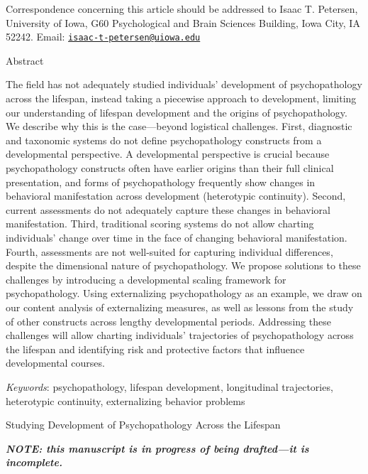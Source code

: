 \documentclass[
  american,
  letterpaper,
  12pt]{article}
\newcommand{\apatitle}[1]{%
  {\centering\bfseries #1\par}}
\newcommand{\apatitlepageheading}[1]{%
  {\centering\bfseries #1\par}}
\begin{document}
Correspondence concerning this article should be addressed to Isaac T.
Petersen, University of Iowa, G60 Psychological and Brain Sciences
Building, Iowa City, IA 52242. Email:
\href{mailto:isaac-t-petersen@uiowa.edu}{\nolinkurl{isaac-t-petersen@uiowa.edu}}

\clearpage

\apatitlepageheading{

Abstract

}

The field has not adequately studied individuals' development of
psychopathology across the lifespan, instead taking a piecewise approach
to development, limiting our understanding of lifespan development and
the origins of psychopathology. We describe why this is the
case---beyond logistical challenges. First, diagnostic and taxonomic
systems do not define psychopathology constructs from a developmental
perspective. A developmental perspective is crucial because
psychopathology constructs often have earlier origins than their full
clinical presentation, and forms of psychopathology frequently show
changes in behavioral manifestation across development (heterotypic
continuity). Second, current assessments do not adequately capture these
changes in behavioral manifestation. Third, traditional scoring systems
do not allow charting individuals' change over time in the face of
changing behavioral manifestation. Fourth, assessments are not
well-suited for capturing individual differences, despite the
dimensional nature of psychopathology. We propose solutions to these
challenges by introducing a developmental scaling framework for
psychopathology. Using externalizing psychopathology as an example, we
draw on our content analysis of externalizing measures, as well as
lessons from the study of other constructs across lengthy developmental
periods. Addressing these challenges will allow charting individuals'
trajectories of psychopathology across the lifespan and identifying risk
and protective factors that influence developmental courses.

\emph{Keywords}: psychopathology, lifespan development, longitudinal
trajectories, heterotypic continuity, externalizing behavior problems

\clearpage

\apatitle{

Studying Development of Psychopathology Across the Lifespan

}

\textbf{\emph{NOTE: this manuscript is in progress of being drafted---it
is incomplete.}}
\end{document}
